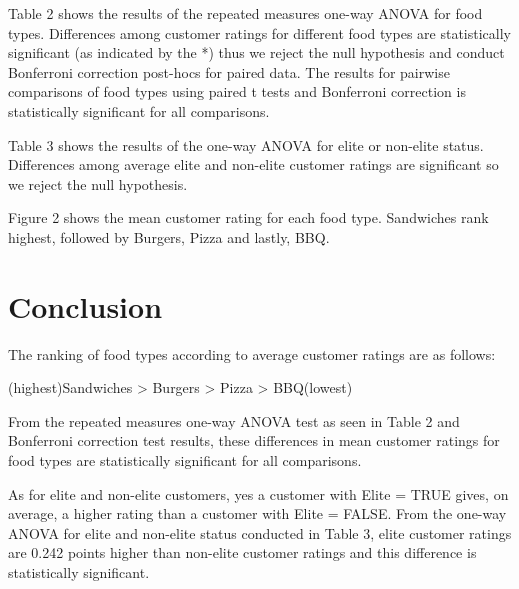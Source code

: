 \documentclass[
]{article}
\begin{document}
Table 2 shows the results of the repeated measures one-way ANOVA for
food types. Differences among customer ratings for different food types
are statistically significant (as indicated by the *) thus we reject the
null hypothesis and conduct Bonferroni correction post-hocs for paired
data. The results for pairwise comparisons of food types using paired t
tests and Bonferroni correction is statistically significant for all
comparisons.

Table 3 shows the results of the one-way ANOVA for elite or non-elite
status. Differences among average elite and non-elite customer ratings
are significant so we reject the null hypothesis.

Figure 2 shows the mean customer rating for each food type. Sandwiches
rank highest, followed by Burgers, Pizza and lastly, BBQ.

\section{Conclusion}

The ranking of food types according to average customer ratings are as
follows:

(highest)Sandwiches \textgreater{} Burgers \textgreater{} Pizza
\textgreater{} BBQ(lowest)

From the repeated measures one-way ANOVA test as seen in Table 2 and
Bonferroni correction test results, these differences in mean customer
ratings for food types are statistically significant for all
comparisons.

As for elite and non-elite customers, yes a customer with Elite = TRUE
gives, on average, a higher rating than a customer with Elite = FALSE.
From the one-way ANOVA for elite and non-elite status conducted in Table
3, elite customer ratings are 0.242 points higher than non-elite
customer ratings and this difference is statistically significant.
\end{document}
